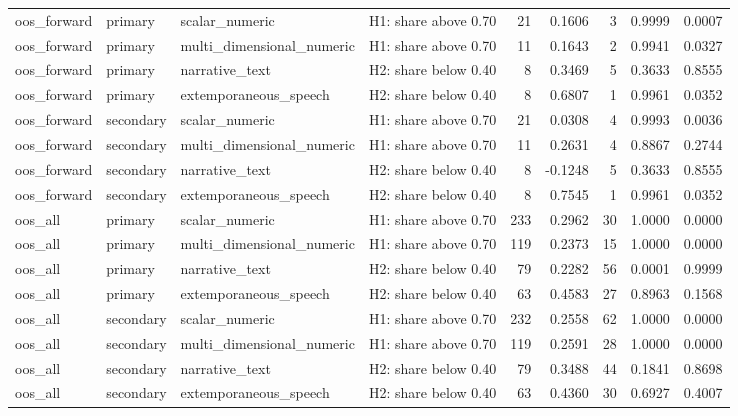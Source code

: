 \begin{tabular}{llllrrrrr}
oos_forward & primary & scalar_numeric & H1: share above 0.70 & 21 & 0.1606 & 3 & 0.9999 & 0.0007 \\
oos_forward & primary & multi_dimensional_numeric & H1: share above 0.70 & 11 & 0.1643 & 2 & 0.9941 & 0.0327 \\
oos_forward & primary & narrative_text & H2: share below 0.40 & 8 & 0.3469 & 5 & 0.3633 & 0.8555 \\
oos_forward & primary & extemporaneous_speech & H2: share below 0.40 & 8 & 0.6807 & 1 & 0.9961 & 0.0352 \\
oos_forward & secondary & scalar_numeric & H1: share above 0.70 & 21 & 0.0308 & 4 & 0.9993 & 0.0036 \\
oos_forward & secondary & multi_dimensional_numeric & H1: share above 0.70 & 11 & 0.2631 & 4 & 0.8867 & 0.2744 \\
oos_forward & secondary & narrative_text & H2: share below 0.40 & 8 & -0.1248 & 5 & 0.3633 & 0.8555 \\
oos_forward & secondary & extemporaneous_speech & H2: share below 0.40 & 8 & 0.7545 & 1 & 0.9961 & 0.0352 \\
oos_all & primary & scalar_numeric & H1: share above 0.70 & 233 & 0.2962 & 30 & 1.0000 & 0.0000 \\
oos_all & primary & multi_dimensional_numeric & H1: share above 0.70 & 119 & 0.2373 & 15 & 1.0000 & 0.0000 \\
oos_all & primary & narrative_text & H2: share below 0.40 & 79 & 0.2282 & 56 & 0.0001 & 0.9999 \\
oos_all & primary & extemporaneous_speech & H2: share below 0.40 & 63 & 0.4583 & 27 & 0.8963 & 0.1568 \\
oos_all & secondary & scalar_numeric & H1: share above 0.70 & 232 & 0.2558 & 62 & 1.0000 & 0.0000 \\
oos_all & secondary & multi_dimensional_numeric & H1: share above 0.70 & 119 & 0.2591 & 28 & 1.0000 & 0.0000 \\
oos_all & secondary & narrative_text & H2: share below 0.40 & 79 & 0.3488 & 44 & 0.1841 & 0.8698 \\
oos_all & secondary & extemporaneous_speech & H2: share below 0.40 & 63 & 0.4360 & 30 & 0.6927 & 0.4007 \\
\bottomrule
\end{tabular}
